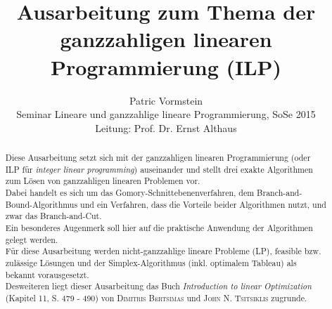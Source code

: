 \documentclass[tog]{acmsiggraph}
\title{Ausarbeitung zum Thema der ganzzahligen linearen Programmierung (ILP)}
\author{Patric Vormstein\\Seminar Lineare und ganzzahlige lineare Programmierung, SoSe 2015\\Leitung: Prof. Dr. Ernst Althaus}
\begin{document}


\maketitle

\begin{abstract}

Diese Ausarbeitung setzt sich mit der ganzzahligen linearen Programmierung (oder ILP für \textit{integer linear programming}) auseinander und stellt drei exakte Algorithmen zum Lösen von ganzzahligen linearen Problemen vor.\\
Dabei handelt es sich um das Gomory-Schnittebenenverfahren, dem Branch-and-Bound-Algorithmus und ein Verfahren, dass die Vorteile beider Algorithmen nutzt, und zwar das Branch-and-Cut.\\
Ein besonderes Augenmerk soll hier auf die praktische Anwendung der Algorithmen gelegt werden.\\
Für diese Ausarbeitung werden nicht-ganzzahlige lineare Probleme (LP), feasible bzw. zulässige Lösungen und der Simplex-Algorithmus (inkl. optimalem Tableau) als bekannt vorausgesetzt.\\
Desweiteren liegt dieser Ausarbeitung das Buch \textit{Introduction to linear Optimization} (Kapitel 11, S. 479 - 490) von \textsc{Dimitris Bertsimas} und \textsc{John N. Tsitsiklis} zugrunde.
\end{abstract}


\end{document}
